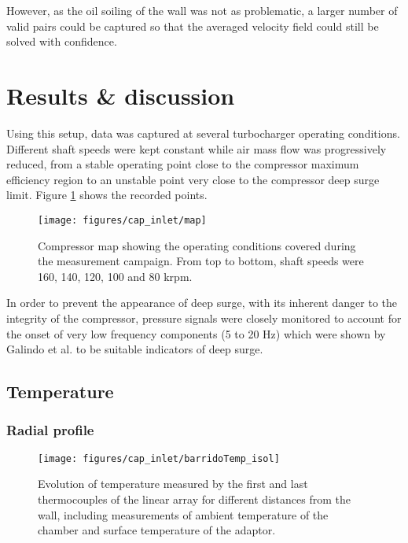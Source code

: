 However, as the oil soiling of the wall was not as problematic, a larger number of valid pairs could be captured so that the averaged velocity field could still be solved with confidence.

\section{Results \& discussion}

Using this setup, data was captured at several turbocharger operating conditions. Different shaft speeds were kept constant while air mass flow was progressively reduced, from a stable operating point close to the compressor maximum efficiency region to an unstable point very close to the compressor deep surge limit. Figure \ref{fig:map_straight} shows the recorded points.

\begin{figure}[b!]
\centering
\texttt{[image: figures/cap\_inlet/map]}
\caption{Compressor map showing the operating conditions covered during the measurement campaign. From top to bottom, shaft speeds were 160, 140, 120, 100 and 80 krpm.}
\label{fig:map_straight}
\end{figure}

In order to prevent the appearance of deep surge, with its inherent danger to the integrity of the compressor, pressure signals were closely monitored to account for the onset of very low frequency components (5 to 20 Hz) which were shown by Galindo et al. \cite{galindo2013engine} to be suitable indicators of deep surge.

\subsection{Temperature}
\label{sub:temperature}

\subsubsection{Radial profile}

\begin{figure}[b!]
\centering
\texttt{[image: figures/cap\_inlet/barridoTemp\_isol]}
\caption{Evolution of temperature measured by the first and last thermocouples of the linear array for different distances from the wall, including measurements of ambient temperature of the chamber and surface temperature of the adaptor.}
\label{fig:barrido_temp}
\end{figure}

